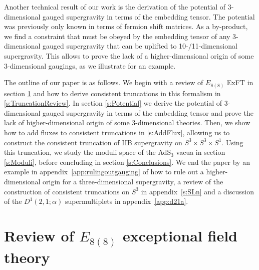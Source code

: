 \documentclass[a4paper, 11pt]{article}
\numberwithin{equation}{section}
\newcommand{\EE}{\ensuremath{E_{8(8)}}\xspace}
\newcommand{\+}{\oplus}
\begin{document}
Another technical result of our work is the derivation of the potential of 3-dimensional gauged supergravity \cite{Nicolai:2000sc,Nicolai:2001sv} in terms of the embedding tensor. The potential was previously only known in terms of fermion shift matrices. As a by-product, we find a constraint that must be obeyed by the embedding tensor of any 3-dimensional gauged supergravity that can be uplifted to 10-/11-dimensional supergravity. This allows to prove the lack of a higher-dimensional origin of some 3-dimensional gaugings, as we illustrate for an example.

The outline of our paper is as follows. We begin with a review of $\EE$ ExFT in section \ref{s:Review} and how to derive consistent truncations in this formalism in \ref{s:TruncationReview}. In section \ref{s:Potential} we derive the potential of 3-dimensional gauged supergravity in terms of the embedding tensor and prove the lack of higher-dimensional origin of some 3-dimensional theories. Then, we show how to add fluxes to consistent truncations in \ref{s:AddFlux}, allowing us to construct the consistent truncation of IIB supergravity on $S^3 \times S^3 \times S^1$. Using this truncation, we study the moduli space of the AdS$_3$ vacua in section \ref{s:Moduli}, before concluding in section \ref{s:Conclusions}. We end the paper by an example in appendix~\ref{app:rulingoutgauging} of how to rule out a higher-dimensional origin for a three-dimensional supergravity, a review of the construction of consistent truncations on $S^{3}$ in appendix~\ref{s:SLn} and a discussion of the $D^{1}(2,1;\alpha)$ supermultiplets in appendix~\ref{app:d21a}.

\section{Review of \texorpdfstring{\EE}{E8(8)} exceptional field theory} \label{s:Review}
\end{document}
